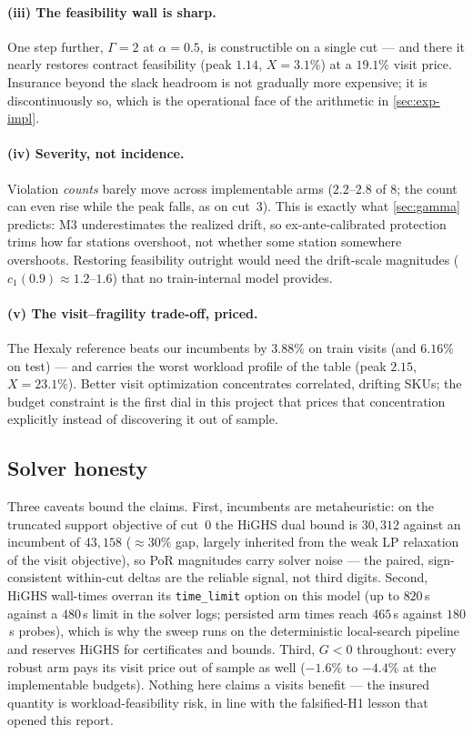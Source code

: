 \paragraph{(iii) The feasibility wall is sharp.}
One step further, $\Gamma = 2$ at $\alpha = 0.5$, is constructible on a
single cut --- and there it nearly restores contract feasibility (peak
$1.14$, $X = 3.1\%$) at a $19.1\%$ visit price. Insurance beyond the slack
headroom is not gradually more expensive; it is discontinuously so, which is
the operational face of the arithmetic in \cref{sec:exp-impl}.

\paragraph{(iv) Severity, not incidence.}
Violation \emph{counts} barely move across implementable arms
($2.2$--$2.8$ of $8$; the count can even rise while the peak falls, as on
cut~3). This is exactly what \cref{sec:gamma} predicts: M3 underestimates the
realized drift, so ex-ante-calibrated protection trims how far stations
overshoot, not whether some station somewhere overshoots. Restoring
feasibility outright would need the drift-scale magnitudes
($c_1(0.9) \approx 1.2$--$1.6$) that no train-internal model provides.

\paragraph{(v) The visit--fragility trade-off, priced.}
The Hexaly reference beats our incumbents by $3.88\%$ on train visits (and
$6.16\%$ on test) --- and carries the worst workload profile of the table
(peak $2.15$, $X = 23.1\%$). Better visit optimization concentrates
correlated, drifting SKUs; the budget constraint is the first dial in this
project that prices that concentration explicitly instead of discovering it
out of sample.

\subsection{Solver honesty}
\label{sec:exp-honesty}

Three caveats bound the claims. First, incumbents are metaheuristic: on the
truncated support objective of cut~0 the HiGHS dual bound is $30{,}312$
against an incumbent of $43{,}158$ ($\approx 30\%$ gap, largely inherited
from the weak LP relaxation of the visit objective), so PoR magnitudes carry
solver noise --- the paired, sign-consistent within-cut deltas are the
reliable signal, not third digits. Second, HiGHS wall-times overran its
\texttt{time\_limit} option on this model (up to $820$\,s against a
$480$\,s limit in the solver logs; persisted arm times reach $465$\,s
against $180$\,s probes), which is why the sweep runs on the deterministic
local-search pipeline and reserves HiGHS for certificates and bounds. Third,
$G < 0$ throughout: every robust arm pays its visit price out of sample as
well ($-1.6\%$ to $-4.4\%$ at the implementable budgets). Nothing here claims
a visits benefit --- the insured quantity is workload-feasibility risk, in
line with the falsified-H1 lesson that opened this report.
